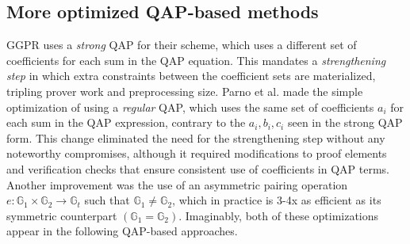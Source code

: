\subsection{More optimized QAP-based methods}
\noindent GGPR uses a \textit{strong} QAP for their scheme, which uses a different set of coefficients for each sum in the QAP equation. This mandates a \textit{strengthening step} in which extra constraints between the coefficient sets are materialized, tripling prover work and preprocessing size. Parno et al. \cite{pinocchio} made the simple optimization of using a \textit{regular} QAP, which uses the same set of coefficients $a_i$ for each sum in the QAP expression, contrary to the $a_i, b_i, c_i$ seen in the strong QAP form. This change eliminated the need for the strengthening step without any noteworthy compromises, although it required modifications to proof elements and verification checks that ensure consistent use of coefficients in QAP terms. Another improvement was the use of an asymmetric pairing operation $e: \mathbb{G}_1 \times \mathbb{G}_2 \to \mathbb{G}_t$ such that $\mathbb{G}_1 \ne \mathbb{G}_2$, which in practice is 3-4x as efficient as its symmetric counterpart $(\mathbb{G}_1 = \mathbb{G}_2)$. Imaginably, both of these optimizations appear in the following QAP-based approaches.\\

